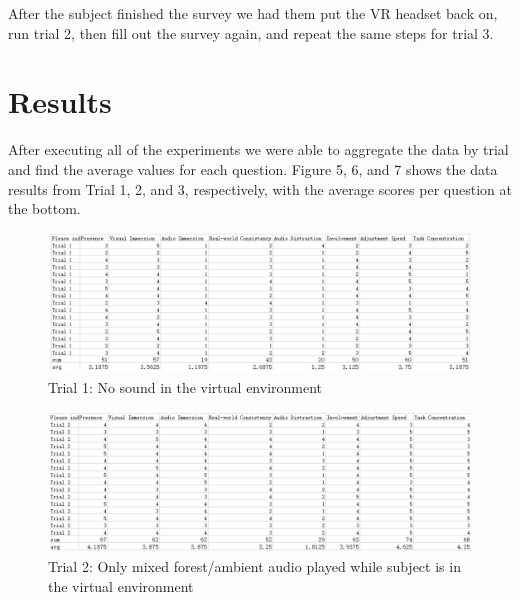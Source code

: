 \documentclass[manuscript,screen,review]{acmart}
\begin{document}
After the subject finished the survey we had them put the VR headset back on, run trial 2, then fill out the survey again, and repeat the same steps for trial 3. 


\section{Results}
After executing all of the experiments we were able to aggregate the data by trial and find the average values for each question. Figure 5, 6, and 7 shows the data results from Trial 1, 2, and 3, respectively, with the average scores per question at the bottom.

\begin{figure}[ht]
  \centering
  \includegraphics[width=\linewidth]{trial1.png}
  \caption{Trial 1: No sound in the virtual environment}
\end{figure}


\begin{figure}[ht]
  \centering
  \includegraphics[width=\linewidth]{trial2.png}
  \caption{Trial 2: Only mixed forest/ambient audio played while subject is in the virtual environment}
\end{figure}
\end{document}
